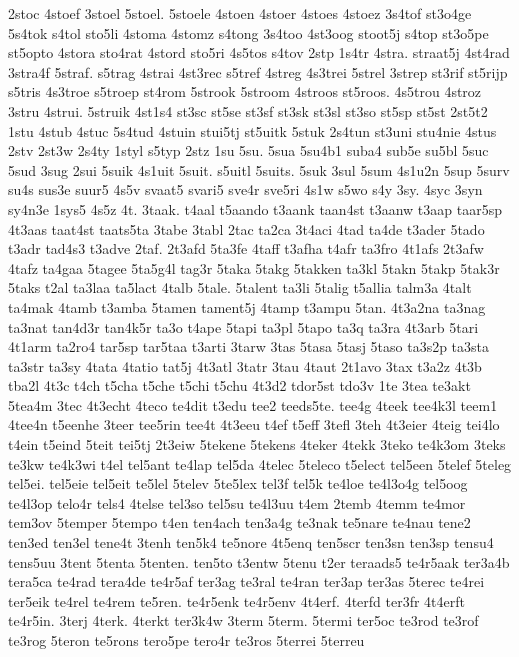 {2stoc
4stoef
3stoel
5stoel.
5stoele
4stoen
4stoer
4stoes
4stoez
3s4tof
st3o4ge
5s4tok
s4tol
sto5li
4stoma
4stomz
s4tong
3s4too
4st3oog
stoot5j
s4top
st3o5pe
st5opto
4stora
sto4rat
4stord
sto5ri
4s5tos
s4tov
2stp
1s4tr
4stra.
straat5j
4st4rad
3stra4f
5straf.
s5trag
4strai
4st3rec
s5tref
4streg
4s3trei
5strel
3strep
st3rif
st5rijp
s5tris
4s3troe
s5troep
st4rom
5strook
5stroom
4stroos
st5roos.
4s5trou
4stroz
3stru
4strui.
5struik
4st1s4
st3sc
st5se
st3sf
st3sk
st3sl
st3so
st5sp
st5st
2st5t2
1stu
4stub
4stuc
5s4tud
4stuin
stui5tj
st5uitk
5stuk
2s4tun
st3uni
stu4nie
4stus
2stv
2st3w
2s4ty
1styl
s5typ
2stz
1su
5su.
5sua
5su4b1
suba4
sub5e
su5bl
5suc
5sud
3sug
2sui
5suik
4s1uit
5suit.
s5uitl
5suits.
5suk
3sul
5sum
4s1u2n
5sup
5surv
su4s
sus3e
suur5
4s5v
svaat5
svari5
sve4r
sve5ri
4s1w
s5wo
s4y
3sy.
4syc
3syn
sy4n3e
1sys5
4s5z
4t.
3taak.
t4aal
t5aando
t3aank
taan4st
t3aanw
t3aap
taar5sp
4t3aas
taat4st
taats5ta
3tabe
3tabl
2tac
ta2ca
3t4aci
4tad
ta4de
t3ader
5tado
t3adr
tad4s3
t3adve
2taf.
2t3afd
5ta3fe
4taff
t3afha
t4afr
ta3fro
4t1afs
2t3afw
4tafz
ta4gaa
5tagee
5ta5g4l
tag3r
5taka
5takg
5takken
ta3kl
5takn
5takp
5tak3r
5taks
t2al
ta3laa
ta5lact
4talb
5tale.
5talent
ta3li
5talig
t5allia
talm3a
4talt
ta4mak
4tamb
t3amba
5tamen
tament5j
4tamp
t3ampu
5tan.
4t3a2na
ta3nag
ta3nat
tan4d3r
tan4k5r
ta3o
t4ape
5tapi
ta3pl
5tapo
ta3q
ta3ra
4t3arb
5tari
4t1arm
ta2ro4
tar5sp
tar5taa
t3arti
3tarw
3tas
5tasa
5tasj
5taso
ta3s2p
ta3sta
ta3str
ta3sy
4tata
4tatio
tat5j
4t3atl
3tatr
3tau
4taut
2t1avo
3tax
t3a2z
4t3b
tba2l
4t3c
t4ch
t5cha
t5che
t5chi
t5chu
4t3d2
tdor5st
tdo3v
1te
3tea
te3akt
5tea4m
3tec
4t3echt
4teco
te4dit
t3edu
tee2
teeds5te.
tee4g
4teek
tee4k3l
teem1
4tee4n
t5eenhe
3teer
tee5rin
tee4t
4t3eeu
t4ef
t5eff
3tefl
3teh
4t3eier
4teig
tei4lo
t4ein
t5eind
5teit
tei5tj
2t3eiw
5tekene
5tekens
4teker
4tekk
3teko
te4k3om
3teks
te3kw
te4k3wi
t4el
tel5ant
te4lap
tel5da
4telec
5teleco
t5elect
tel5een
5telef
5teleg
tel5ei.
tel5eie
tel5eit
te5lel
5telev
5te5lex
tel3f
tel5k
te4loe
te4l3o4g
tel5oog
te4l3op
telo4r
tels4
4telse
tel3so
tel5su
te4l3uu
t4em
2temb
4temm
te4mor
tem3ov
5temper
5tempo
t4en
ten4ach
ten3a4g
te3nak
te5nare
te4nau
tene2
ten3ed
ten3el
tene4t
3tenh
ten5k4
te5nore
4t5enq
ten5scr
ten3sn
ten3sp
tensu4
tens5uu
3tent
5tenta
5tenten.
ten5to
t3entw
5tenu
t2er
teraads5
te4r5aak
ter3a4b
tera5ca
te4rad
tera4de
te4r5af
ter3ag
te3ral
te4ran
ter3ap
ter3as
5terec
te4rei
ter5eik
te4rel
te4rem
te5ren.
te4r5enk
te4r5env
4t4erf.
4terfd
ter3fr
4t4erft
te4r5in.
3terj
4terk.
4terkt
ter3k4w
3term
5term.
5termi
ter5oc
te3rod
te3rof
te3rog
5teron
te5rons
tero5pe
tero4r
te3ros
5terrei
5terreu
}
